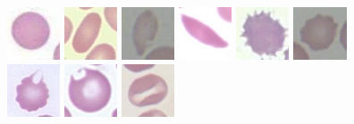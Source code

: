\documentclass[final,a4paper,12pt,english]{UnicaPhdThesis3}
\begin{document}
\begin{figure}[!htbp]
	\centering
	\includegraphics[width=0.14\textwidth]{images/2016_2_sitis/spherocyte}\vspace{1mm}
	\includegraphics[width=0.14\textwidth]{images/2016_2_sitis/Ovalocyte}
	\includegraphics[width=0.14\textwidth]{images/2016_2_sitis/Tear}
	\includegraphics[width=0.14\textwidth]{images/2016_2_sitis/sickle}
	\includegraphics[width=0.14\textwidth]{images/2016_2_sitis/Acanthocyte}
	\includegraphics[width=0.14\textwidth]{images/2016_2_sitis/Echinocyte}
	\includegraphics[width=0.14\textwidth]{images/2016_2_sitis/keratocyte}
	\includegraphics[width=0.14\textwidth]{images/2016_2_sitis/bite}
	\includegraphics[width=0.14\textwidth]{images/2016_2_sitis/Stomatocyte}

\end{figure}
\end{document}
